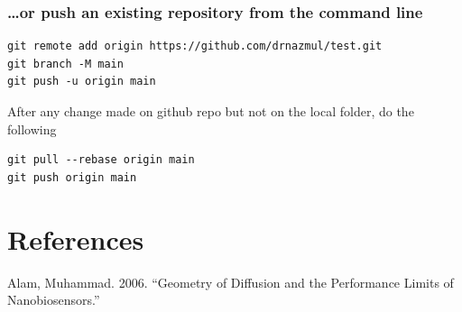 \documentclass[
  letterpaper,
  DIV=11,
  numbers=noendperiod]{scrreprt}
\newlength{\cslhangindent}
\newlength{\cslentryspacingunit} %
\newenvironment{CSLReferences}[2] %
 {%
  \setlength{\parindent}{0pt}
  \ifodd #1
  \let\oldpar\par
  \def\par{\hangindent=\cslhangindent\oldpar}
  \fi
  \setlength{\parskip}{#2\cslentryspacingunit}
 }%
 {}
\begin{document}
\hypertarget{or-push-an-existing-repository-from-the-command-line}{%
\subsection{\ldots or push an existing repository from the command
line}\label{or-push-an-existing-repository-from-the-command-line}}

\begin{verbatim}
git remote add origin https://github.com/drnazmul/test.git
git branch -M main
git push -u origin main
\end{verbatim}

After any change made on github repo but not on the local folder, do the
following

\begin{verbatim}
git pull --rebase origin main
git push origin main
\end{verbatim}


\hypertarget{references}{%
\chapter*{References}\label{references}}


\hypertarget{refs}{}
\begin{CSLReferences}{1}{0}
\leavevmode{}%
Alam, Muhammad. 2006. {``Geometry of Diffusion and the Performance
Limits of Nanobiosensors.''}

\end{CSLReferences}
\end{document}

